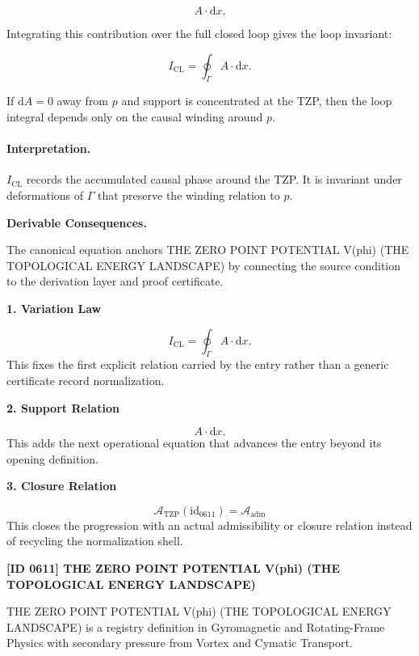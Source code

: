 \begin{equation}
A\cdot \mathrm{d}x .
\end{equation}

Integrating this contribution over the full closed loop gives the loop invariant:

\begin{equation}
I_{\mathrm{CL}}
=
\oint_{\Gamma} A\cdot \mathrm{d}x .
\end{equation}

If $\mathrm{d}A=0$ away from $p$ and support is concentrated at the TZP, then the loop integral depends only on the causal winding around $p$.

\paragraph{Interpretation.}
$I_{\mathrm{CL}}$ records the accumulated causal phase around the TZP. It is invariant under deformations of $\Gamma$ that preserve the winding relation to $p$.

\par\vspace{0.35em}
\noindent\textbf{Derivable Consequences.}\quad
\begingroup
\footnotesize
\raggedright
The canonical equation anchors THE ZERO POINT POTENTIAL V(phi) (THE TOPOLOGICAL ENERGY LANDSCAPE) by connecting the source condition to the derivation layer and proof certificate.
\par\endgroup

\noindent\textbf{1. Variation Law}\par
\[
I_{\mathrm{CL}} = \oint_{\Gamma} A\cdot \mathrm{d}x.
\]
\noindent This fixes the first explicit relation carried by the entry rather than a generic certificate record normalization.\par
\noindent\textbf{2. Support Relation}\par
\[
A\cdot \mathrm{d}x.
\]
\noindent This adds the next operational equation that advances the entry beyond its opening definition.\par
\noindent\textbf{3. Closure Relation}\par
\[
\mathcal{A}_{\mathrm{TZP}}(\mathrm{id}_{0611})=\mathcal{A}_{\mathrm{adm}}
\]
\noindent This closes the progression with an actual admissibility or closure relation instead of recycling the normalization shell.\par

\clearpage
\noindent\textbf{[ID 0611] THE ZERO POINT POTENTIAL V(phi) (THE TOPOLOGICAL ENERGY LANDSCAPE)}\par
\vspace{0.35em}
\begingroup\small
{}
THE ZERO POINT POTENTIAL V(phi) (THE TOPOLOGICAL ENERGY LANDSCAPE) is a registry definition in Gyromagnetic and Rotating-Frame Physics with secondary pressure from Vortex and Cymatic Transport.

